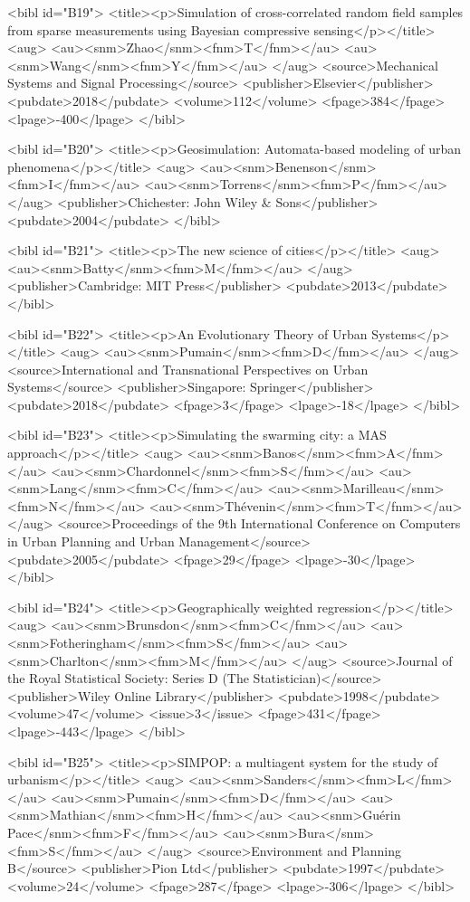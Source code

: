 \documentclass{article}
\begin{document}
{<bibl id="B19">
  <title><p>Simulation of cross-correlated random field samples from sparse
  measurements using Bayesian compressive sensing</p></title>
  <aug>
    <au><snm>Zhao</snm><fnm>T</fnm></au>
    <au><snm>Wang</snm><fnm>Y</fnm></au>
  </aug>
  <source>Mechanical Systems and Signal Processing</source>
  <publisher>Elsevier</publisher>
  <pubdate>2018</pubdate>
  <volume>112</volume>
  <fpage>384</fpage>
  <lpage>-400</lpage>
</bibl>

<bibl id="B20">
  <title><p>Geosimulation: Automata-based modeling of urban
  phenomena</p></title>
  <aug>
    <au><snm>Benenson</snm><fnm>I</fnm></au>
    <au><snm>Torrens</snm><fnm>P</fnm></au>
  </aug>
  <publisher>Chichester: John Wiley \& Sons</publisher>
  <pubdate>2004</pubdate>
</bibl>

<bibl id="B21">
  <title><p>The new science of cities</p></title>
  <aug>
    <au><snm>Batty</snm><fnm>M</fnm></au>
  </aug>
  <publisher>Cambridge: MIT Press</publisher>
  <pubdate>2013</pubdate>
</bibl>

<bibl id="B22">
  <title><p>An Evolutionary Theory of Urban Systems</p></title>
  <aug>
    <au><snm>Pumain</snm><fnm>D</fnm></au>
  </aug>
  <source>International and Transnational Perspectives on Urban
  Systems</source>
  <publisher>Singapore: Springer</publisher>
  <pubdate>2018</pubdate>
  <fpage>3</fpage>
  <lpage>-18</lpage>
</bibl>

<bibl id="B23">
  <title><p>Simulating the swarming city: a MAS approach</p></title>
  <aug>
    <au><snm>Banos</snm><fnm>A</fnm></au>
    <au><snm>Chardonnel</snm><fnm>S</fnm></au>
    <au><snm>Lang</snm><fnm>C</fnm></au>
    <au><snm>Marilleau</snm><fnm>N</fnm></au>
    <au><snm>Th{\'e}venin</snm><fnm>T</fnm></au>
  </aug>
  <source>Proceedings of the 9th International Conference on Computers in Urban
  Planning and Urban Management</source>
  <pubdate>2005</pubdate>
  <fpage>29</fpage>
  <lpage>-30</lpage>
</bibl>

<bibl id="B24">
  <title><p>Geographically weighted regression</p></title>
  <aug>
    <au><snm>Brunsdon</snm><fnm>C</fnm></au>
    <au><snm>Fotheringham</snm><fnm>S</fnm></au>
    <au><snm>Charlton</snm><fnm>M</fnm></au>
  </aug>
  <source>Journal of the Royal Statistical Society: Series D (The
  Statistician)</source>
  <publisher>Wiley Online Library</publisher>
  <pubdate>1998</pubdate>
  <volume>47</volume>
  <issue>3</issue>
  <fpage>431</fpage>
  <lpage>-443</lpage>
</bibl>

<bibl id="B25">
  <title><p>SIMPOP: a multiagent system for the study of urbanism</p></title>
  <aug>
    <au><snm>Sanders</snm><fnm>L</fnm></au>
    <au><snm>Pumain</snm><fnm>D</fnm></au>
    <au><snm>Mathian</snm><fnm>H</fnm></au>
    <au><snm>Gu{\'e}rin Pace</snm><fnm>F</fnm></au>
    <au><snm>Bura</snm><fnm>S</fnm></au>
  </aug>
  <source>Environment and Planning B</source>
  <publisher>Pion Ltd</publisher>
  <pubdate>1997</pubdate>
  <volume>24</volume>
  <fpage>287</fpage>
  <lpage>-306</lpage>
</bibl>

}
\end{document}
